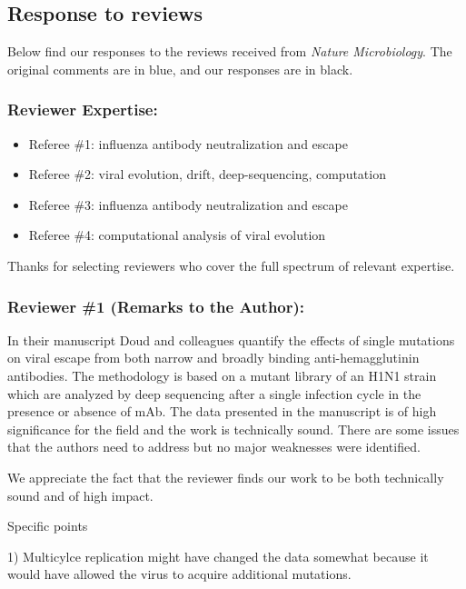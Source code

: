 \documentclass[11pt, oneside]{article}   	%
\begin{document}
\subsection*{Response to reviews}
Below find our responses to the reviews received from \textit{Nature Microbiology}.
The original comments {\color{blue} are in blue}, and our responses are in black.

\color{blue}

\subsubsection*{Reviewer Expertise:}

\begin{itemize}\parskip1pt
\item Referee \#1: influenza antibody neutralization and escape
\item Referee \#2: viral evolution, drift, deep-sequencing, computation
\item Referee \#3: influenza antibody neutralization and escape
\item Referee \#4: computational analysis of viral evolution
\end{itemize}

{\color{black}
Thanks for selecting reviewers who cover the full spectrum of relevant expertise.}

\subsubsection*{Reviewer \#1 (Remarks to the Author):}

In their manuscript Doud and colleagues quantify the effects of single mutations on viral escape from both narrow and broadly binding anti-hemagglutinin antibodies. The methodology is based on a mutant library of an H1N1 strain which are analyzed by deep sequencing after a single infection cycle in the presence or absence of mAb. The data presented in the manuscript is of high significance for the field and the work is technically sound. There are some issues that the authors need to address but no major weaknesses were identified.

{\color{black}
We appreciate the fact that the reviewer finds our work to be both technically sound and of high impact.}

Specific points

1) Multicylce replication might have changed the data somewhat because it would have allowed the virus to acquire additional mutations. 
\end{document}
